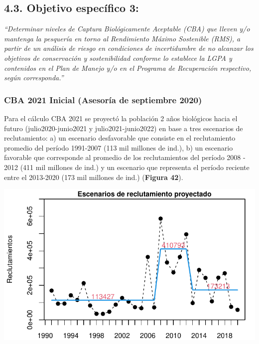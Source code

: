 \documentclass[
  spanish,
]{article}
\begin{document}
\normalsize

\pagebreak

\hypertarget{objetivo-especuxedfico-3-1}{%
\subsection{4.3. Objetivo específico
3:}\label{objetivo-especuxedfico-3-1}}

\vspace{-0.2cm}

\emph{``Determinar niveles de Captura Biológicamente Aceptable (CBA) que
lleven y/o mantenga la pesquería en torno al Rendimiento Máximo
Sostenible (RMS), a partir de un análisis de riesgo en condiciones de
incertidumbre de no alcanzar los objetivos de conservación y
sostenibilidad conforme lo establece la LGPA y contenidos en el Plan de
Manejo y/o en el Programa de Recuperación respectivo, según
corresponda.''}

\hypertarget{cba-2021-inicial-asesoruxeda-de-septiembre-2020}{%
\subsubsection{CBA 2021 Inicial (Asesoría de septiembre
2020)}\label{cba-2021-inicial-asesoruxeda-de-septiembre-2020}}

Para el cálculo CBA 2021 se proyectó la población 2 años biológicos
hacia el futuro (julio2020-junio2021 y julio2021-junio2022) en base a
tres escenarios de reclutamiento: a) un escenario desfavorable que
consiste en el reclutamiento promedio del período 1991-2007 (113 mil
millones de ind.), b) un escenario favorable que corresponde al promedio
de los reclutamientos del período 2008 - 2012 (411 mil millones de ind.)
y un escenario que representa el período reciente entre el 2013-2020
(173 mil millones de ind.) (\textbf{Figura 42}). \vspace{0.5cm}

\begin{center}\includegraphics{FigurasInforme_Marzo/Fig42_Reclproy_sept-1} \end{center}
\end{document}
